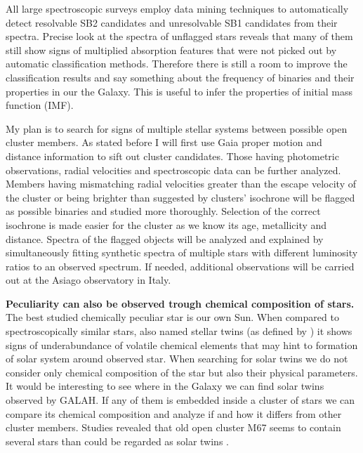 All large spectroscopic surveys employ data mining techniques to automatically detect resolvable SB2 candidates \cite{2010AJ....140..184M, 2017ApJS..228...24T} and unresolvable SB1 candidates \cite{2011AJ....141..200M} from their spectra. Precise look at the spectra of unflagged stars reveals that many of them still show signs of multiplied absorption features that were not picked out by automatic classification methods. Therefore there is still a room to improve the classification results and say something about the frequency of binaries and their properties in our the Galaxy. This is useful to infer the properties of initial mass function (IMF).

My plan is to search for signs of multiple stellar systems between possible open cluster members. As stated before I will first use Gaia proper motion and distance information to sift out cluster candidates. Those having photometric observations, radial velocities and spectroscopic data can be further analyzed. Members having mismatching radial velocities greater than the escape velocity of the cluster or being brighter than suggested by clusters' isochrone will be flagged as possible binaries and studied more thoroughly. Selection of the correct isochrone is made easier for the cluster as we know its age, metallicity and distance. Spectra  of the flagged objects will be analyzed and explained by simultaneously fitting \cite{2018MNRAS.473.5043E} synthetic spectra \cite{2005A&A...442.1127M} of multiple stars with different luminosity ratios to an observed spectrum. If needed, additional observations will be carried out at the Asiago observatory in Italy. %


\textbf{Peculiarity can also be observed trough chemical composition of stars.} The best studied chemically peculiar star is our own Sun. When compared to spectroscopically similar stars, also named stellar twins (as defined by \cite{2017AN....338..442A}) it shows signs of underabundance of volatile chemical elements \cite{2009ApJ...704L..66M} that may hint to formation of solar system around observed star. When searching for solar twins we do not consider only chemical composition of the star but also their physical parameters. It would be interesting to see where in the Galaxy we can find solar twins observed by GALAH. If any of them is embedded inside a cluster of stars we can compare its chemical composition and analyze if and how it differs from other cluster members. Studies revealed that old open cluster M67 seems to contain several stars than could be regarded as solar twins \cite{2009MmSAI..80..125B, 2016MNRAS.463..696L}.


